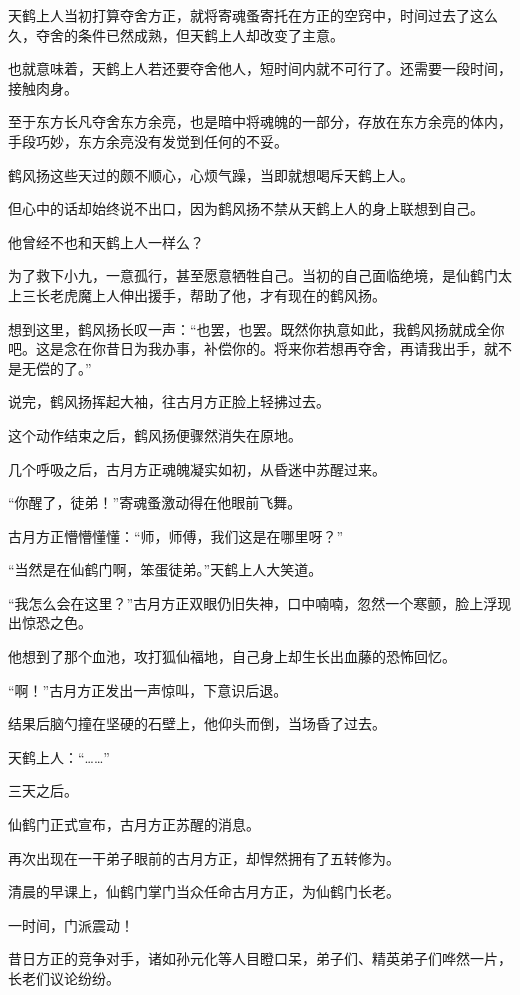 \begin{this_body}
天鹤上人当初打算夺舍方正，就将寄魂蚤寄托在方正的空窍中，时间过去了这么久，夺舍的条件已然成熟，但天鹤上人却改变了主意。

也就意味着，天鹤上人若还要夺舍他人，短时间内就不可行了。还需要一段时间，接触肉身。

至于东方长凡夺舍东方余亮，也是暗中将魂魄的一部分，存放在东方余亮的体内，手段巧妙，东方余亮没有发觉到任何的不妥。

鹤风扬这些天过的颇不顺心，心烦气躁，当即就想喝斥天鹤上人。

但心中的话却始终说不出口，因为鹤风扬不禁从天鹤上人的身上联想到自己。

他曾经不也和天鹤上人一样么？

为了救下小九，一意孤行，甚至愿意牺牲自己。当初的自己面临绝境，是仙鹤门太上三长老虎魔上人伸出援手，帮助了他，才有现在的鹤风扬。

想到这里，鹤风扬长叹一声：“也罢，也罢。既然你执意如此，我鹤风扬就成全你吧。这是念在你昔日为我办事，补偿你的。将来你若想再夺舍，再请我出手，就不是无偿的了。”

说完，鹤风扬挥起大袖，往古月方正脸上轻拂过去。

这个动作结束之后，鹤风扬便骤然消失在原地。

几个呼吸之后，古月方正魂魄凝实如初，从昏迷中苏醒过来。

“你醒了，徒弟！”寄魂蚤激动得在他眼前飞舞。

古月方正懵懵懂懂：“师，师傅，我们这是在哪里呀？”

“当然是在仙鹤门啊，笨蛋徒弟。”天鹤上人大笑道。

“我怎么会在这里？”古月方正双眼仍旧失神，口中喃喃，忽然一个寒颤，脸上浮现出惊恐之色。

他想到了那个血池，攻打狐仙福地，自己身上却生长出血藤的恐怖回忆。

“啊！”古月方正发出一声惊叫，下意识后退。

结果后脑勺撞在坚硬的石壁上，他仰头而倒，当场昏了过去。

天鹤上人：“……”

三天之后。

仙鹤门正式宣布，古月方正苏醒的消息。

再次出现在一干弟子眼前的古月方正，却悍然拥有了五转修为。

清晨的早课上，仙鹤门掌门当众任命古月方正，为仙鹤门长老。

一时间，门派震动！

昔日方正的竞争对手，诸如孙元化等人目瞪口呆，弟子们、精英弟子们哗然一片，长老们议论纷纷。


\end{this_body}
